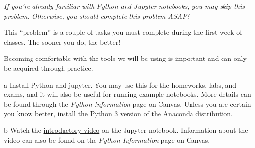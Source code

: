 \documentclass[]{homework}
\begin{document}


\begin{problem}{0}

  {\em If you're already familiar with Python and Jupyter notebooks, you may skip this problem. Otherwise,
  you should complete this problem ASAP!}

  This ``problem'' is a couple of tasks you must complete during the first week of classes.
  The sooner you do, the better!

  Becoming comfortable with the tools we will be using is important and can only be acquired through practice.
  
  \begin{subproblem}{a}
    Install Python and jupyter. 
    You may use this for the homeworks, labs, and exams, and it will also be useful for running example notebooks.
    More details can be found through the \emph{Python Information} page on Canvas.
    Unless you are certain you know better, install the Python 3 version of the Anaconda distribution.
  \end{subproblem}

  \begin{subproblem}{b}
    Watch the \href{https://www.youtube.com/watch?v=DKiI6NfSIe8}{introductory video} on the Jupyter notebook.
    Information about the video can also be found on the \emph{Python Information} page on Canvas.
  \end{subproblem}

\end{problem}



\end{document}
